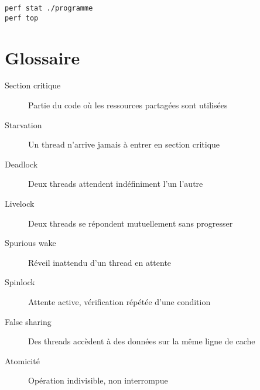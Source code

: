 \documentclass{article}
\begin{document}
\begin{multicols*}{3}
\begin{lstlisting}
perf stat ./programme
perf top
\end{lstlisting}

\section *{Glossaire}
\begin{description}
    \item[Section critique] Partie du code où les ressources partagées sont utilisées
    \item[Starvation] Un thread n'arrive jamais à entrer en section critique
    \item[Deadlock] Deux threads attendent indéfiniment l'un l'autre
    \item[Livelock] Deux threads se répondent mutuellement sans progresser
    \item[Spurious wake] Réveil inattendu d'un thread en attente
    \item[Spinlock] Attente active, vérification répétée d'une condition
    \item[False sharing] Des threads accèdent à des données sur la même ligne de cache
    \item[Atomicité] Opération indivisible, non interrompue
\end{description}
\end{multicols*}
\end{document}
